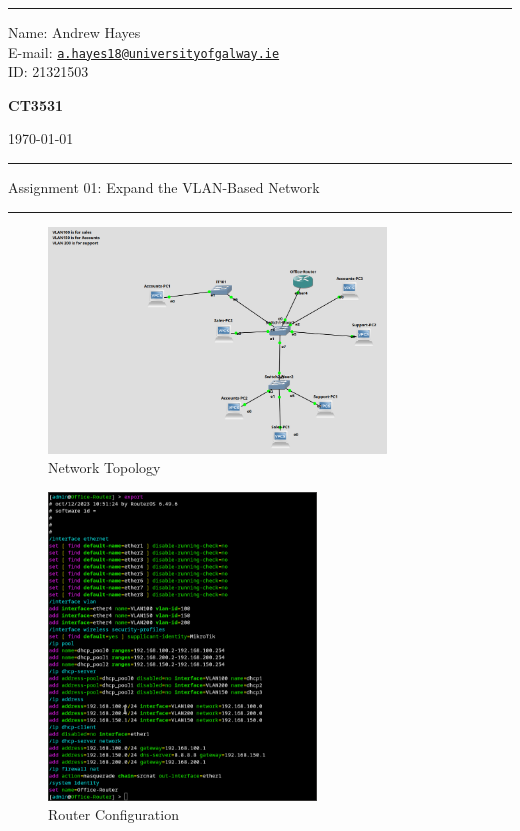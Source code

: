 \documentclass[a4paper]{article}
\begin{document}
\hrule \medskip
\begin{minipage}{0.295\textwidth} 
    \raggedright
    \footnotesize 
    Name: Andrew Hayes \\
    E-mail: \href{mailto://a.hayes18@universityofgalway.ie}{\texttt{a.hayes18@universityofgalway.ie}}  \hfill\\   
    ID: 21321503 \hfill
\end{minipage}
\begin{minipage}{0.4\textwidth} 
    \centering 
    \vspace{0.4em}
    \Large 
    \textbf{CT3531} \\ 
\end{minipage}
\begin{minipage}{0.295\textwidth} 
    \raggedleft
    \today
\end{minipage}
\medskip\hrule 
\begin{center}
    \normalsize
    Assignment 01: Expand the VLAN-Based Network
\end{center}
\hrule

\begin{figure}[H]
    \centering
    \includegraphics[width=0.8\textwidth]{./images/one.png}
    \caption{Network Topology}
\end{figure}

\begin{figure}[H]
    \centering
    \includegraphics[width=0.635\textwidth]{./images/router_conf.png}
    \caption{Router Configuration}
\end{figure}
\end{document}
